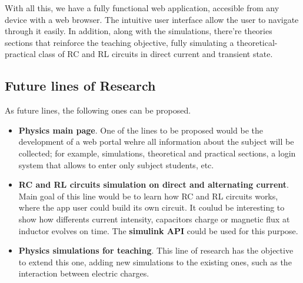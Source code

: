 \documentclass[../main.tex]{subfiles}
\begin{document}
With all this, we have a fully functional web application, accesible from any device with a web browser. The intuitive user interface allow the user to navigate through it easily. In addition, along with the simulations, there're theories sections that reinforce the teaching objective, fully simulating a theoretical-practical class of RC and RL circuits in direct current and transient state.


\subsection{Future lines of Research}
As future lines, the following ones can be proposed.

\begin{itemize}
    \item \textbf{Physics main page}. One of the lines to be proposed would be the development of a web portal wehre all information about the subject will be collected; for example, simulations, theoretical and practical sections, a login system that allows to enter only subject students, etc.
    
    \item \textbf{RC and RL circuits simulation on direct and alternating current}. Main goal of this line would be to learn how RC and RL circuits works, where the app user could build its own circuit. It coulud be interesting to show how differents current intensity, capacitors charge or magnetic flux at inductor evolves on time. The \textbf{simulink API} could be used for this purpose.
    
    \item \textbf{Physics simulations for teaching}. This line of research has the objective to extend this one, adding new simulations to the existing ones, such as the interaction between electric charges.
\end{itemize}
\end{document}
